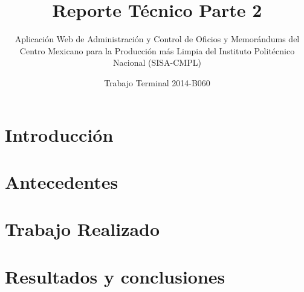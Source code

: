 \documentclass[oneside,10pt]{book}
\title{Reporte Técnico Parte 2}
\subtitle{Aplicación Web de Administración y Control de Oficios y Memorándums del Centro Mexicano para la Producción más Limpia del Instituto Politécnico Nacional (SISA-CMPL)}
\author{Trabajo Terminal 2014-B060}
\begin{document}
\maketitle
\thispagestyle{empty}

\frontmatter
\tableofcontents

\mainmatter

\chapter{Introducción}


\chapter{Antecedentes}


\chapter{Trabajo Realizado}


\chapter{Resultados y conclusiones}


	
\end{document}
